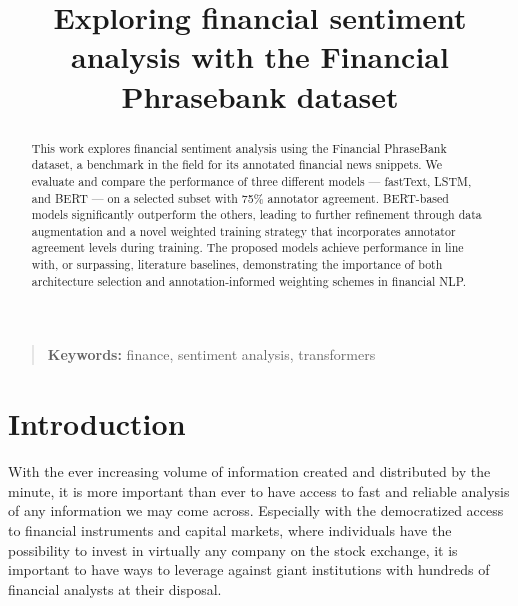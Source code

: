 \documentclass[conference]{IEEEtran}
\begin{document}
\title{Exploring financial sentiment analysis with the Financial Phrasebank dataset}

\author{
\and
{}
}

\maketitle
\thispagestyle{plain}

\begin{abstract}
This work explores financial sentiment analysis using the Financial PhraseBank dataset, a benchmark in the field for its annotated financial news snippets. We evaluate and compare the performance of three different models — fastText, LSTM, and BERT — on a selected subset with 75\% annotator agreement. BERT-based models significantly outperform the others, leading to further refinement through data augmentation and a novel weighted training strategy that incorporates annotator agreement levels during training. The proposed models achieve performance in line with, or surpassing, literature baselines, demonstrating the importance of both architecture selection and annotation-informed weighting schemes in financial NLP.
\end{abstract}

\begin{quote}
\small
\noindent
\textbf{Keywords:} finance, sentiment analysis, transformers
\end{quote}

\IEEEpeerreviewmaketitle


\section{Introduction}

With the ever increasing volume of information created and distributed by the minute, it is more important than ever to have access to fast and reliable analysis of any information we may come across. Especially with the democratized access to financial instruments and capital markets, where individuals have the possibility to invest in virtually any company on the stock exchange, it is important to have ways to leverage against giant institutions with hundreds of financial analysts at their disposal. 
\end{document}
